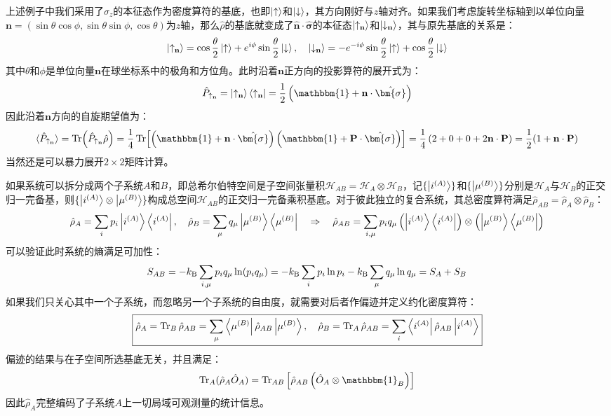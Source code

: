 \begin{proposition}[其他基底下的单电子自旋系统]
上述例子中我们采用了$\sigma_z$的本征态作为密度算符的基底，也即$\ket{\uparrow}$和$\ket{\downarrow}$，其方向刚好与$z$轴对齐。如果我们考虑旋转坐标轴到以单位向量$\mathbf{n}=(\sin\theta\cos\phi,\sin\theta\sin\phi,\cos\theta)$为$z$轴，那么$\hat{\rho}$的基底就变成了$\hat{\mathbf{n}}\cdot\hat{\bm{\sigma}}$的本征态$\ket{\uparrow_{\mathbf{n}}}$和$\ket{\downarrow_{\mathbf{n}}}$，其与原先基底的关系是：
\[\ket{\uparrow_{\mathbf{n}}}=\cos\frac{\theta}{2}\ket{\uparrow}+e^{i\phi}\sin\frac{\theta}{2}\ket{\downarrow}, \quad \ket{\downarrow_{\mathbf{n}}}=-e^{-i\phi}\sin\frac{\theta}{2}\ket{\uparrow}+\cos\frac{\theta}{2}\ket{\downarrow}\]
其中$\theta$和$\phi$是单位向量$\mathbf{n}$在球坐标系中的极角和方位角。此时沿着$\mathbf{n}$正方向的投影算符的展开式为：
\[\hat{P}_{\uparrow_{\mathbf{n}}}=\ket{\uparrow_{\mathbf{n}}}\bra{\uparrow_{\mathbf{n}}}=\frac{1}{2}\left(\mathbbm{1}+\mathbf{n}\cdot\hat{\bm{\sigma}}\right)\]
因此沿着$\mathbf{n}$方向的自旋期望值为：
\[\langle\hat{P}_{\uparrow_{\mathbf{n}}}\rangle=\Tr(\hat{P}_{\uparrow_{\mathbf{n}}}\hat{\rho})=\frac{1}{4}\Tr[\left(\mathbbm{1}+\mathbf{n}\cdot\hat{\bm{\sigma}}\right)\left(\mathbbm{1}+\mathbf{P}\cdot\hat{\bm{\sigma}}\right)]=\frac{1}{4}\left(2+0+0+2\mathbf{n}\cdot\mathbf{P}\right)=\frac{1}{2}(1+\mathbf{n}\cdot\mathbf{P})\]
当然还是可以暴力展开$2 \times 2$矩阵计算。
\end{proposition}

如果系统可以拆分成两个子系统$A$和$B$，即总希尔伯特空间是子空间张量积$\mathcal{H}_{AB}=\mathcal{H}_A\otimes\mathcal{H}_B$，记$\{\ket{i^{(A)}}\}$和$\{\ket{\mu^{(B)}}\}$分别是$\mathcal{H}_A$与$\mathcal{H}_B$的正交归一完备基，则$\{\ket{i^{(A)}}\otimes\ket{\mu^{(B)}}\}$构成总空间$\mathcal{H}_{AB}$的正交归一完备乘积基底。对于彼此独立的复合系统，其总密度算符满足$\hat{\rho}_{AB}=\hat{\rho}_A\otimes\hat{\rho}_B$：
\[\hat{\rho}_A=\sum_i p_i\ket{i^{(A)}}\bra{i^{(A)}}, \quad \hat{\rho}_B=\sum_{\mu}q_{\mu}\ket{\mu^{(B)}}\bra{\mu^{(B)}} \quad \Rightarrow \quad \hat{\rho}_{AB}=\sum_{i,\mu}p_iq_{\mu}\left(\ket{i^{(A)}}\bra{i^{(A)}}\right)\otimes\left(\ket{\mu^{(B)}}\bra{\mu^{(B)}}\right)\]
可以验证此时系统的熵满足可加性：
\[S_{AB}=-k_{\rm B}\sum_{i,\mu}p_iq_{\mu}\ln(p_iq_{\mu})=-k_{\rm B}\sum_ip_i\ln p_i-k_{\rm B}\sum_{\mu}q_{\mu}\ln q_{\mu}=S_A+S_B\]
如果我们只关心其中一个子系统，而忽略另一个子系统的自由度，就需要对后者作偏迹并定义约化密度算符：
\[\boxed{\hat{\rho}_A=\Tr_B\hat{\rho}_{AB}=\sum_{\mu}\bra{\mu^{(B)}}\hat{\rho}_{AB}\ket{\mu^{(B)}}, \quad \hat{\rho}_B=\Tr_A\hat{\rho}_{AB}=\sum_i\bra{i^{(A)}}\hat{\rho}_{AB}\ket{i^{(A)}}}\]
偏迹的结果与在子空间所选基底无关，并且满足：
\[\Tr_A(\hat{\rho}_A\hat{O}_A)=\Tr_{AB}\left[\hat{\rho}_{AB}\left(\hat{O}_A\otimes\mathbbm{1}_B\right)\right]\]
因此$\hat{\rho}_A$完整编码了子系统$A$上一切局域可观测量的统计信息。

